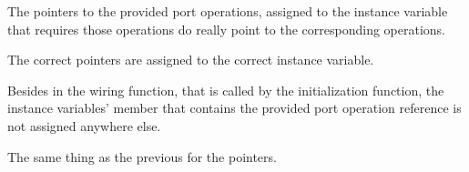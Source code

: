 \begin{compactenum}

\item The pointers to the provided port operations, assigned to the instance
variable that requires those operations do really point to the corresponding
operations.

\item The correct pointers are assigned to the correct instance variable.

\item Besides in the wiring function, that is called by the initialization
function, the instance variables' member that contains the provided port
operation reference is not assigned anywhere else.

\item The same thing as the previous for the pointers.
\end{compactenum}
























